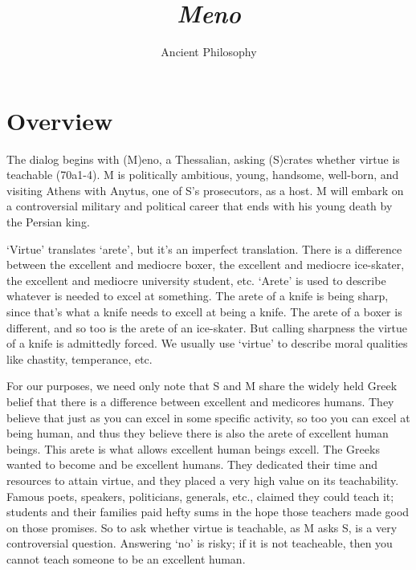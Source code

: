 \documentclass[10 pt]{article}
\begin{document}
\author{Ancient Philosophy}
\title{\emph{Meno}}

\section*{Overview}
The dialog begins with (M)eno, a Thessalian, asking (S)crates whether virtue is teachable (70a1-4). M is politically ambitious, young, handsome, well-born, and visiting Athens with Anytus, one of S's prosecutors, as a host.  M will embark on a controversial military and political career that ends with his young death by the Persian king.  

`Virtue' translates `arete', but it's an imperfect translation. There is a difference between the excellent and mediocre boxer, the excellent and mediocre ice-skater, the excellent and mediocre university student, etc. `Arete' is used to describe whatever is needed to excel at something.  The arete of a knife is being sharp, since that's what a knife needs to excell at being a knife. The arete of a boxer is different, and so too is the arete of an ice-skater.  But calling sharpness the virtue of a knife is admittedly forced. We usually use `virtue' to describe moral qualities like chastity, temperance, etc.

For our purposes, we need only note that S and M share the widely held Greek belief that there is a difference between excellent and medicores humans. They believe that just as you can excel in some specific activity, so too you can excel at being human, and thus they believe there is also the arete of excellent human beings. This arete is what allows excellent human beings excell. The Greeks wanted to become and be excellent humans. They dedicated their time and resources to attain virtue, and they placed a very high value on its teachability.  Famous poets, speakers, politicians, generals, etc., claimed they could teach it; students and their families paid hefty sums in the hope those teachers made good on those promises. So to ask whether virtue is teachable, as M asks S, is a very controversial question. Answering `no' is risky; if it is not teacheable, then you cannot teach someone to be an excellent human. 
\end{document}
